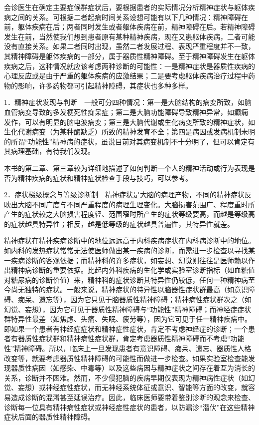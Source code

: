 会诊医生在确定主要症候群症状后，要根据患者的实际情况分析精神症状与躯体疾病之间的关系。可根据二者起病时间关系设想可能有以下几种情况：精神障碍在前，躯体疾病在后；两者同时发生或者躯体疾病在前，精神障碍在后。若精神障碍发生在前，当然使我们想到患者原有某种精神疾病，现在又患躯体疾病，二者可能没有直接关系。如果二者同时出现，虽然二者发展过程、表现严重程度并不一致，其精神障碍是躯体疾病的一部分，属于器质性精神障碍。至于精神障碍发生在躯体疾病之后，这种情况就应该考虑两种诊断的可能性：一是精神症状是器质性疾病的心理反应或是由于严重的躯体疾病的应激结果；二是要考虑躯体疾病治疗过程中药物的影响，许多药物都可引起精神障碍，其症状也多种多样。

1．精神症状发现与判断　一般可分四种情况：第一是大脑结构的病变所致，如脑血管病变导致的多发梗死性痴呆症；第二是大脑功能障碍导致精神异常，如癫痫
发作，可以有明显的脑电波病变；第三是大脑代谢或生化病变所致的精神症状，如生化代谢病变（为某种酶缺乏）所致的精神发育不全；第四是病因或发病机制未明的所谓“功能性”精神病的症状，虽说目前对其病变机制不十分明了，但可以肯定有其病理基础，有待我们发现。

本书的第二章、第三章较为详细地描述了如何判断一个人的精神活动或行为表现是否为精神疾病的症状和精神症状检查手段与技巧，可以参考。

2．症状梯级概念与等级诊断制　精神症状是大脑的病理产物，不同的精神症状反映出大脑不同广度与不同严重程度的病理生理变化。大脑损害范围广、程度重时所产生的症状较之大脑损害程度轻、范围窄时所产生的症状等级要高，而越是等级高的症状越具特异性；相反，越是低等级的症状越具普遍性，其特异性就差。

精神症状在精神疾病诊断中的地位远远高于内科疾病症状在内科病诊断中的地位。如内科的发热症状常常无法使医师做出某一疾病的诊断，而需进一步检查以寻找某一疾病诊断的客观依据；而精神科的许多症状，如妄想、幻觉则往往是医师赖以作出精神病诊断的重要依据。比起内外科疾病的生化学或实验室诊断指标（如血糖值对糖尿病的诊断价值）来，精神科的症状诊断其特异性仍较低，任何一种精神病至今尚无独特的症状。一般来说，精神症状的特异性以脑器性症状群最高（如意识障碍、痴呆、遗忘等），因为它只见于脑器质性精神障碍；精神病性症状群次之（如幻觉、妄想），因为它可见于器质性精神障碍与“功能性”精神障碍；而神经症症状群特异性最差（如焦虑、头痛、失眠、疲劳等），因为它可见于任一精神疾病中。即如果一个患者有神经症症状和精神症性症状，肯定不考虑神经症的诊断；一个患者有器质性症状群和精神病性症状群，肯定考虑器质性精神障碍而不考虑“功能性”精神障碍。所以，临床上一旦发现患者有意识障碍、痴呆、遗忘、器质性人格改变等，就要考虑器质性精神障碍的可能性而做进一步检查。如果实验室检查能发现器质性病因（如感染、中毒等）以及这些病因与精神症状之间存在着互为消长的关系，诊断并不困难。然而，不少侵犯脑的疾病早期仅表现为精神病性症状（如幻觉、妄想）或神经症性症状，而无神经系统体征或意识、智能等方面的改变，就容易造成诊断的混淆甚至延误治疗。因此，临床医师要带着鉴别诊断的观念来检查、诊断每一位具有精神病性症状或神经症性症状的患者，以防漏诊“潜伏”在这些精神症状后面的器质性精神障碍。


